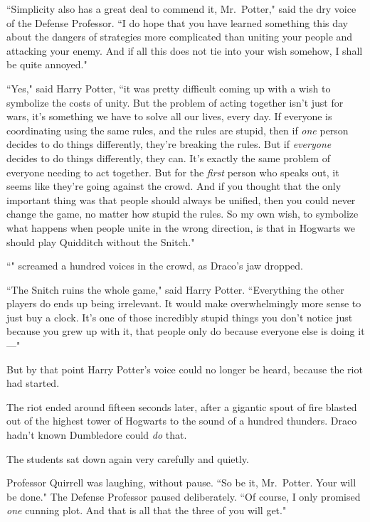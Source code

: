 ``Simplicity also has a great deal to commend it, Mr.~Potter," said the dry voice of the Defense Professor. ``I do hope that you have learned something this day about the dangers of strategies more complicated than uniting your people and attacking your enemy. And if all this does not tie into your wish somehow, I shall be quite annoyed."

``Yes," said Harry Potter, ``it was pretty difficult coming up with a wish to symbolize the costs of unity. But the problem of acting together isn't just for wars, it's something we have to solve all our lives, every day. If everyone is coordinating using the same rules, and the rules are stupid, then if \emph{one} person decides to do things differently, they're breaking the rules. But if \emph{everyone} decides to do things differently, they can. It's exactly the same problem of everyone needing to act together. But for the \emph{first} person who speaks out, it seems like they're going against the crowd. And if you thought that the only important thing was that people should always be unified, then you could never change the game, no matter how stupid the rules. So my own wish, to symbolize what happens when people unite in the wrong direction, is that in Hogwarts we should play Quidditch without the Snitch."

``" screamed a hundred voices in the crowd, as Draco's jaw dropped.

``The Snitch ruins the whole game," said Harry Potter. ``Everything the other players do ends up being irrelevant. It would make overwhelmingly more sense to just buy a clock. It's one of those incredibly stupid things you don't notice just because you grew up with it, that people only do because everyone else is doing it—"

But by that point Harry Potter's voice could no longer be heard, because the riot had started.

\later

The riot ended around fifteen seconds later, after a gigantic spout of fire blasted out of the highest tower of Hogwarts to the sound of a hundred thunders. Draco hadn't known Dumbledore could \emph{do} that.

The students sat down again very carefully and quietly.

Professor Quirrell was laughing, without pause. ``So be it, Mr.~Potter. Your will be done." The Defense Professor paused deliberately. ``Of course, I only promised \emph{one} cunning plot. And that is all that the three of you will get."

